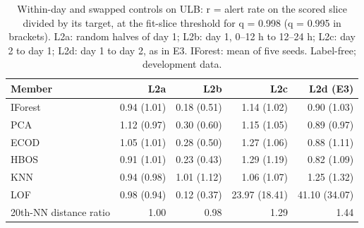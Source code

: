 \begin{table}[t]
\centering
\footnotesize
\setlength{\tabcolsep}{4pt}
\caption{Within-day and swapped controls on ULB: r = alert rate on the scored slice divided by its target, at the fit-slice threshold for q = 0.998 (q = 0.995 in brackets). L2a: random halves of day 1; L2b: day 1, 0--12 h to 12--24 h; L2c: day 2 to day 1; L2d: day 1 to day 2, as in E3. IForest: mean of five seeds. Label-free; development data.}
\label{tab:lof-l2}
\begin{tabular}{lrrrr}
\toprule
Member & L2a & L2b & L2c & L2d (E3) \\
\midrule
IForest & 0.94 (1.01) & 0.18 (0.51) & 1.14 (1.02) & 0.90 (1.03) \\
PCA & 1.12 (0.97) & 0.30 (0.60) & 1.15 (1.05) & 0.89 (0.97) \\
ECOD & 1.05 (1.01) & 0.28 (0.50) & 1.27 (1.06) & 0.88 (1.11) \\
HBOS & 0.91 (1.01) & 0.23 (0.43) & 1.29 (1.19) & 0.82 (1.09) \\
KNN & 0.94 (0.98) & 1.01 (1.12) & 1.06 (1.07) & 1.25 (1.32) \\
LOF & 0.98 (0.94) & 0.12 (0.37) & 23.97 (18.41) & 41.10 (34.07) \\
20th-NN distance ratio & 1.00 & 0.98 & 1.29 & 1.44 \\
\bottomrule
\end{tabular}
\end{table}
